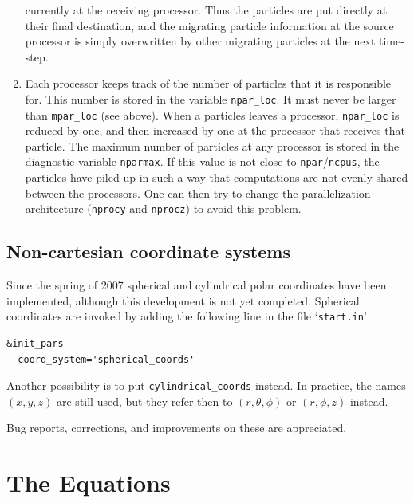 \documentclass[\mydriver,12pt,twoside,notitlepage,a4paper]{article}
\makeatletter
\newcommand{\code}[1]{\texttt{#1}}
\newcommand{\file}[2][]{%
  \def\index@{#1}%
  `\texttt{#2}'%
  \ifx\index@\@empty\index[file]{#2@\texttt{#2}}%
  \else\index[file]{#1@\texttt{#1}}%
  \fi%
}
\makeatother
\begin{document}
\begin{enumerate}
      currently at the receiving processor. Thus the particles are put directly
      at their final destination, and the migrating particle information at
      the source processor is simply overwritten by other migrating particles
      at the next time-step.
  \item Each processor keeps track of the number of particles that it is
      responsible for. This number is stored in the variable \code{npar_loc}.
      It must never be larger than \code{mpar_loc} (see above). When a
      particles leaves a processor, \code{npar_loc} is reduced by one, and then
      increased by one at the processor that receives that particle. The
      maximum number of particles at any processor is stored in the diagnostic
      variable \code{nparmax}. If this value is not close to
      \code{npar}/\code{ncpus}, the particles have piled up in such a way that
      computations are not evenly shared between the processors. One can then
      try to change the parallelization architecture (\code{nprocy} and
      \code{nprocz}) to avoid this problem.
\end{enumerate}


\subsection{Non-cartesian coordinate systems}

Since the spring of 2007 spherical and cylindrical polar coordinates
have been implemented, although this development is not yet completed.
Spherical coordinates are invoked by adding the following line
in the file \file{start.in}
\begin{verbatim}
&init_pars
  coord_system='spherical_coords'
\end{verbatim}
Another possibility is to put \code{cylindrical_coords} instead.
In practice, the names $(x,y,z)$ are still used, but they refer then
to $(r,\theta,\phi)$ or $(r,\phi,z)$ instead.

Bug reports, corrections, and improvements on these are appreciated.


\section{The Equations}
\end{document}
